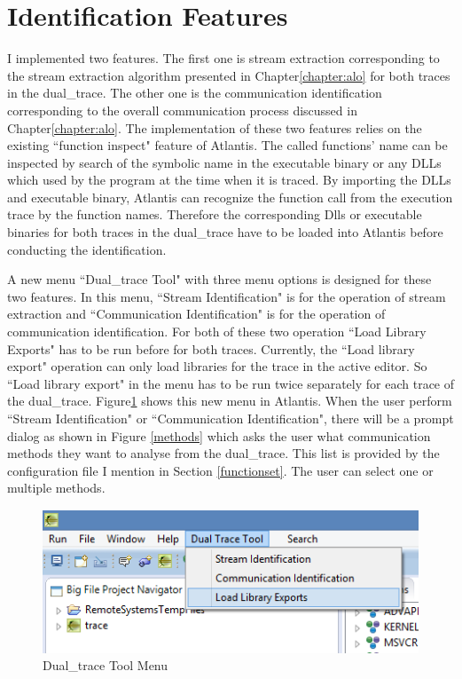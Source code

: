 \section{Identification Features}
I implemented two features. The first one is stream extraction corresponding to the stream extraction algorithm presented in Chapter\ref{chapter:alo} for both traces in the dual\_trace. The other one is the communication identification corresponding to the overall communication process discussed in Chapter\ref{chapter:alo}. The implementation of these two features relies on the existing ``function inspect" feature of Atlantis. The called functions' name can be inspected  by  search of the symbolic name in the executable binary or any DLLs which used by the program at the time when it is traced. By importing the DLLs and executable binary, Atlantis can recognize the function call from the execution trace by the function names. Therefore the corresponding Dlls or executable binaries for both traces in the dual\_trace have to be loaded into Atlantis before conducting the identification.

A new menu ``Dual\_trace Tool" with three menu options is designed for these two features. In this menu, ``Stream Identification" is for the operation of stream extraction and ``Communication Identification" is for the operation of communication identification. For both of these two operation ``Load Library Exports" has to be run before for both traces. Currently, the ``Load library export"  operation can only load libraries for the trace in the active editor. So ``Load library export"  in the menu has to be run twice separately for each trace of the dual\_trace.  Figure\ref{dualtracetoolmenu} shows this new menu in Atlantis. When the user perform ``Stream Identification" or ``Communication Identification", there will be a prompt dialog as shown in Figure \ref{methods} which asks the user what communication methods they want to analyse from the dual\_trace. This list is provided by the configuration file I mention in Section \ref{functionset}. The user can select one or multiple methods. 

\begin{figure}[H]
\centerline{\includegraphics{Figures/dualtracetoolmenu}}
 \caption{Dual\_trace Tool Menu}
\label{dualtracetoolmenu}
\end{figure}

